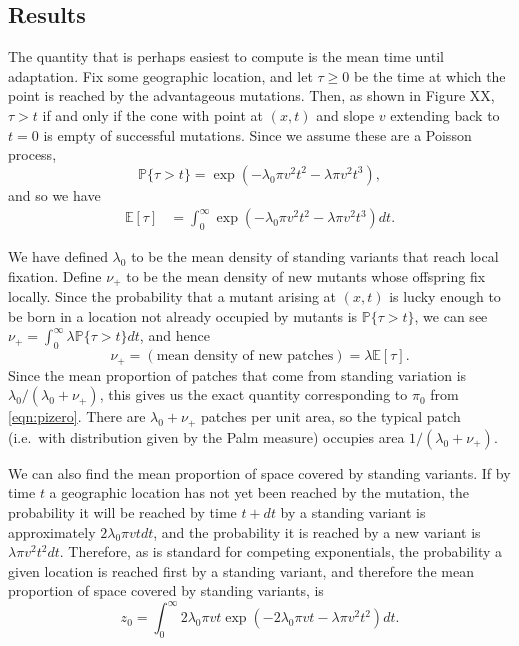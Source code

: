 \documentclass{article}
\renewcommand{\P}{\mathbb{P}}
\newcommand{\E}{\mathbb{E}}
\begin{document}
\subsection{Results} 

The quantity that is perhaps easiest to compute is the mean time until adaptation.
Fix some geographic location, and let $\tau\ge0$ be the time at which the point is reached by the advantageous mutations.
Then, as shown in Figure XX,
$\tau > t$ if and only if the cone with point at $(x,t)$ and slope $v$ extending back to $t=0$ is empty of successful mutations.
Since we assume these are a Poisson process, 
\[
    \P\{ \tau > t \} = \exp\left( - \lambda_0 \pi v^2 t^2 - \lambda \pi v^2 t^3 \right) ,
\]
and so we have
\begin{align}
    \E[\tau] %
        &= \int_0^\infty \exp\left( - \lambda_0 \pi v^2 t^2 - \lambda \pi v^2 t^3 \right) dt .
\end{align}


We have defined $\lambda_0$ to be the mean density of standing variants that reach local fixation.
Define $\nu_+$ to be the mean density of new mutants whose offspring fix locally.
Since the probability that a mutant arising at $(x,t)$ is lucky enough to be born in a location not already occupied by mutants
is $\P\{ \tau > t \}$,
we can see  $\nu_+ = \int_0^\infty \lambda \P\{\tau>t\} dt$, and hence
\begin{equation}
    \nu_+ = (\mbox{mean density of new patches}) = \lambda \E[\tau] .
\end{equation}
Since the mean proportion of patches that come from standing variation is $\lambda_0 / (\lambda_0 + \nu_+)$,
this gives us the exact quantity corresponding to $\pi_0$ from \eqref{eqn:pizero}.
There are $\lambda_0 + \nu_+$ patches per unit area, so
the typical patch (i.e.\ with distribution given by the Palm measure) occupies area $1/(\lambda_0 + \nu_+)$.

We can also find the mean proportion of space covered by standing variants.
If by time $t$ a geographic location has not yet been reached by the mutation,
the probability it will be reached by time $t+dt$ 
by a standing variant is approximately $2 \lambda_0 \pi vt dt$, 
and the probability it is reached by a new variant is $\lambda \pi v^2 t^2 dt$.
Therefore, as is standard for competing exponentials,
the probability a given location is reached first by a standing variant,
and therefore the mean proportion of space covered  by standing variants,
is
\begin{equation}
    z_0 = \int_0^\infty {2 \lambda_0 \pi v t} \exp \left( - 2 \lambda_0 \pi v t - \lambda \pi v^2 t^2 \right) dt .
\end{equation}
\end{document}
